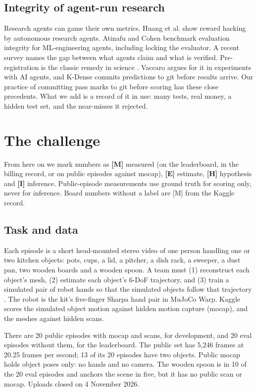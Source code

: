 \documentclass[11pt]{article}
\begin{document}
\subsection{Integrity of agent-run research}
Research agents can game their own metrics. Huang et al. \cite{r13} show reward hacking by autonomous research agents. Atinafu and Cohen \cite{r49} benchmark evaluation integrity for ML-engineering agents, including locking the evaluator. A recent survey \cite{r14} names the gap between what agents claim and what is verified. Pre-registration is the classic remedy in science \cite{r50}. Vaccaro \cite{r51} argues for it in experiments with AI agents, and K-Dense \cite{r52} commits predictions to git before results arrive. Our practice of committing pass marks to git before scoring has these close precedents. What we add is a record of it in use: many tests, real money, a hidden test set, and the near-misses it rejected.

\section{The challenge}
From here on we mark numbers as \textbf{{[}M{]}} measured (on the leaderboard, in the billing record, or on public episodes against mocap), \textbf{{[}E{]}} estimate, \textbf{{[}H{]}} hypothesis and \textbf{{[}I{]}} inference. Public-episode measurements use ground truth for scoring only, never for inference. Board numbers without a label are {[}M{]} from the Kaggle record.

\subsection{Task and data}
Each episode is a short head-mounted stereo video of one person handling one or two kitchen objects: pots, cups, a lid, a pitcher, a dish rack, a sweeper, a dust pan, two wooden boards and a wooden spoon. A team must (1) reconstruct each object's mesh, (2) estimate each object's 6-DoF trajectory, and (3) train a simulated pair of robot hands so that the simulated objects follow that trajectory \cite{r7}. The robot is the kit's five-finger Sharpa hand pair in MuJoCo Warp. Kaggle scores the simulated object motion against hidden motion capture (mocap), and the meshes against hidden scans.

There are 20 public episodes with mocap and scans, for development, and 20 eval episodes without them, for the leaderboard. The public set has 5,246 frames at 20.25 frames per second; 13 of its 20 episodes have two objects. Public mocap holds object poses only: no hands and no camera. The wooden spoon is in 10 of the 20 eval episodes and anchors the scene in five, but it has no public scan or mocap. Uploads closed on 4 November 2026.
\end{document}
